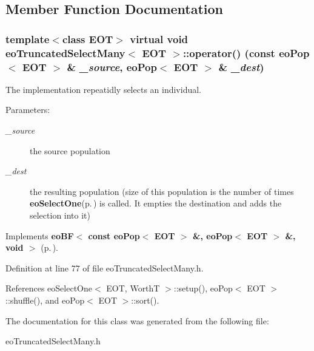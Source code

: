 \subsection{Member Function Documentation}
\subsubsection{\setlength{\rightskip}{0pt plus 5cm}template$<$class EOT$>$ virtual void {\bf eo\-Truncated\-Select\-Many}$<$ {\bf EOT} $>$::operator() (const {\bf eo\-Pop}$<$ {\bf EOT} $>$ \& {\em \_\-source}, {\bf eo\-Pop}$<$ {\bf EOT} $>$ \& {\em \_\-dest})\hspace{0.3cm}{\tt  [inline, virtual]}}\label{classeo_truncated_select_many_a2}


The implementation repeatidly selects an individual. 

\begin{Desc}
\item[Parameters:]
\begin{description}
\item[{\em \_\-source}]the source population \item[{\em \_\-dest}]the resulting population (size of this population is the number of times {\bf eo\-Select\-One}{\rm (p.\,\pageref{classeo_select_one})} is called. It empties the destination and adds the selection into it) \end{description}
\end{Desc}


Implements {\bf eo\-BF$<$ const eo\-Pop$<$ EOT $>$ \&, eo\-Pop$<$ EOT $>$ \&, void $>$} {\rm (p.\,\pageref{classeo_b_f_a1})}.

Definition at line 77 of file eo\-Truncated\-Select\-Many.h.

References eo\-Select\-One$<$ EOT, Worth\-T $>$::setup(), eo\-Pop$<$ EOT $>$::shuffle(), and eo\-Pop$<$ EOT $>$::sort().

The documentation for this class was generated from the following file:\begin{CompactItemize}
\item 
eo\-Truncated\-Select\-Many.h\end{CompactItemize}
